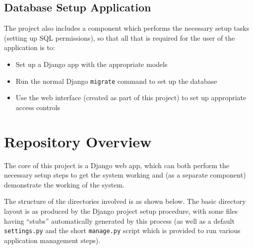 \documentclass[12pt]{report}
\begin{document}
\subsection{Database Setup Application}
The project also includes a component which performs the necessary setup tasks (setting up SQL permissions), so that all that is required for the user of the application is to:
\begin{itemize}
\item
  Set up a Django app with the appropriate models
\item
  Run the normal Django \texttt{migrate} command to set up the database
\item
  Use the web interface (created as part of this project) to set up appropriate access controls
\end{itemize}

\section{Repository Overview}
The core of this project is a Django web app, which can both perform the necessary setup steps to get the system working and (as a separate component) demonstrate the working of the system.

The structure of the directories involved is as shown below. The basic directory layout is as produced by the Django project setup procedure, with some files having ``stubs'' automatically generated by this process (as well as a default \texttt{settings.py} and the short \texttt{manage.py} script which is provided to run various application management steps).

\begin{multicols}{2}
  \columnbreak
\end{multicols}
\end{document}
